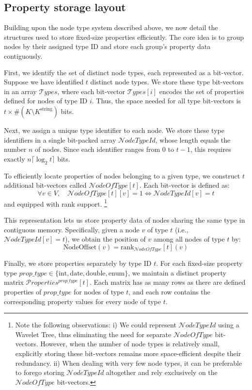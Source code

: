 \subsection{Property storage layout}

Building upon the node type system described above, we now detail the structures used to store fixed-size properties efficiently. The core idea is to group nodes by their assigned type ID and store each group's property data contiguously.

First, we identify the set of distinct node types, each represented as a bit-vector. Suppose we have identified \( t \) distinct node types. We store these type bit-vectors in an array \(\mathcal Types\), where each bit-vector \(\mathcal Types[i]\) encodes the set of properties defined for nodes of type ID \( i \). Thus, the space needed for all type bit-vectors is \( t \times \#(K \setminus K^{\text{string}}) \) bits.

Next, we assign a unique type identifier to each node. We store these type identifiers in a single bit-packed array \(\mathcal NodeTypeId \), whose length equals the number \( n \) of nodes. Since each identifier ranges from \( 0 \) to \( t - 1 \), this requires exactly \( n \lceil \log_2 t \rceil \) bits.

To efficiently locate properties of nodes belonging to a given type, we construct \( t \) additional bit-vectors called \(\mathcal NodeOfType [t]\). Each bit-vector is defined as:
\[
\forall v \in V,\quad \mathcal NodeOfType[t][v] = 1 \iff \mathcal NodeTypeId[v] = t
\]
and equipped with rank support. \footnote{Note the following observations: i) We could represent $\mathcal NodeTypeId$ using a Wavelet Tree\cite[Section~6.2]{CompactDS}, thus eliminating the need for separate $\mathcal NodeOfType$ bit-vectors. However, when the number of node types is relatively small, explicitly storing these bit-vectors remains more space-efficient despite their redundancy. ii) When dealing with very few node types, it can be preferable to forego storing $\mathcal NodeTypeId$ altogether and rely exclusively on the $\mathcal NodeOfType$ bit-vectors.}

This representation lets us store property data of nodes sharing the same type in contiguous memory. Specifically, given a node \( v \) of type \( t \) (i.e., \(\mathcal NodeTypeId [v] = t\)), we obtain the position of \( v \) among all nodes of type \( t \) by:
\[
\mathrm{NodeOffset}(v) = \text{rank}_{\mathcal NodeOfType}[t] (v)
\]

Finally, we store properties separately by type ID \( t \). For each fixed-size property type \(prop\_type \in \{\text{int}, \text{date}, \text{double}, \text{enum}\}\), we maintain a distinct property matrix \(\mathcal Properties^{\textit{prop\_type}}[t]\). Each matrix has as many rows as there are defined properties of \(prop\_type\) for nodes of type \( t \), and each row contains the corresponding property values for every node of type \( t \).

